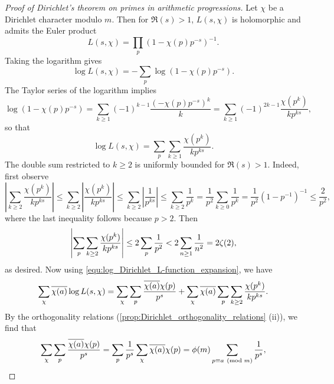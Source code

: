       \begin{proof}[Proof of Dirichlet's theorem on primes in arithmetic progressions]
          Let $\chi$ be a Dirichlet character modulo $m$. Then for $\Re(s) > 1$, $L(s,\chi)$ is holomorphic and admits the Euler product
          \[
            L(s,\chi) = \prod_{p}(1-\chi(p)p^{-s})^{-1}.
          \]
          Taking the logarithm gives
          \[
            \log L(s,\chi) = -\sum_{p}\log(1-\chi(p)p^{-s}).
          \]
          The Taylor series of the logarithm implies
          \[
            \log(1-\chi(p)p^{-s}) = \sum_{k \ge 1}(-1)^{k-1}\frac{(-\chi(p)p^{-s})^{k}}{k} = \sum_{k \ge 1}(-1)^{2k-1}\frac{\chi(p^{k})}{kp^{ks}},
          \]
          so that
          \begin{equation}\label{equ:log_Dirichlet_L-function_expansion}
            \log L(s,\chi) = \sum_{p}\sum_{k \ge 1}\frac{\chi(p^{k})}{kp^{ks}}.
          \end{equation}
          The double sum restricted to $k \ge 2$ is uniformly bounded for $\Re(s) > 1$. Indeed, first observe
          \[
            \left|\sum_{k \ge 2}\frac{\chi(p^{k})}{kp^{ks}}\right| \le \sum_{k \ge 2}\left|\frac{\chi(p^{k})}{kp^{ks}}\right| \le \sum_{k \ge 2}\left|\frac{1}{p^{ks}}\right| \le \sum_{k \ge 2}\frac{1}{p^{k}} = \frac{1}{p^{2}}\sum_{k \ge 0}\frac{1}{p^{k}} = \frac{1}{p^{2}}(1-p^{-1})^{-1} \le \frac{2}{p^{2}},
          \]
          where the last inequality follows because $p > 2$. Then
          \[
            \left|\sum_{p}\sum_{k \ge 2}\frac{\chi(p^{k})}{kp^{ks}}\right| \le 2\sum_{p}\frac{1}{p^{2}} < 2\sum_{n \ge 1}\frac{1}{n^{2}} = 2\zeta(2),
          \]
          as desired. Now using \cref{equ:log_Dirichlet_L-function_expansion}, we have
          \begin{equation}\label{equ:Dirichlet's_theorem_on_primes_in_arithmetric_progressions_1}
            \sum_{\chi}\overline{\chi(a)}\log L(s,\chi) = \sum_{\chi}\sum_{p}\frac{\overline{\chi(a)}\chi(p)}{p^{s}}+\sum_{\chi}\overline{\chi(a)}\sum_{p}\sum_{k \ge 2}\frac{\chi(p^{k})}{kp^{ks}}.
          \end{equation}
          By the orthogonality relations (\cref{prop:Dirichlet_orthogonality_relations} (ii)), we find that
          \begin{equation}\label{equ:Dirichlet's_theorem_on_primes_in_arithmetric_progressions_2}
            \sum_{\chi}\sum_{p}\frac{\overline{\chi(a)}\chi(p)}{p^{s}} = \sum_{p}\frac1{p^{s}}\sum_{\chi}\overline{\chi(a)}\chi(p) = \phi(m)\sum_{p \equiv{a} \ \left(\text{mod }m\right)}\frac{1}{p^{s}},
          \end{equation}

\end{proof}
